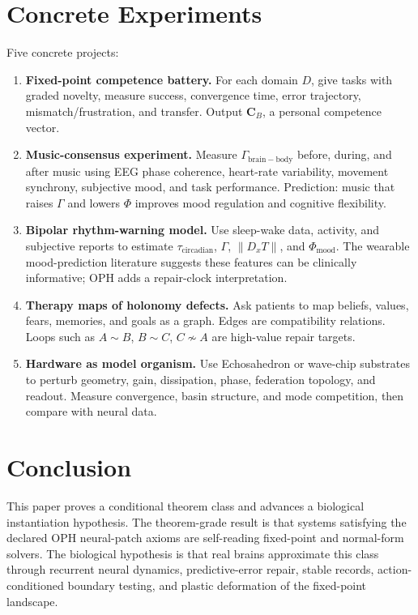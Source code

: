 \documentclass[11pt]{article}
\theoremstyle{remark}
\theoremstyle{plain}
\begin{document}
\section{Concrete Experiments}

Five concrete projects:
\begin{enumerate}
\item \textbf{Fixed-point competence battery.} For each domain \(D\), give tasks with graded novelty, measure success, convergence time, error trajectory, mismatch/frustration, and transfer. Output \(\mathbf C_B\), a personal competence vector.
\item \textbf{Music-consensus experiment.} Measure \(\Gamma_{\mathrm{brain-body}}\) before, during, and after music using EEG phase coherence, heart-rate variability, movement synchrony, subjective mood, and task performance. Prediction: music that raises \(\Gamma\) and lowers \(\Phi\) improves mood regulation and cognitive flexibility.
\item \textbf{Bipolar rhythm-warning model.} Use sleep-wake data, activity, and subjective reports to estimate \(\tau_{\mathrm{circadian}}\), \(\Gamma\), \(\|D_xT\|\), and \(\Phi_{\mathrm{mood}}\). The wearable mood-prediction literature suggests these features can be clinically informative; OPH adds a repair-clock interpretation.
\item \textbf{Therapy maps of holonomy defects.} Ask patients to map beliefs, values, fears, memories, and goals as a graph. Edges are compatibility relations. Loops such as \(A\sim B\), \(B\sim C\), \(C\not\sim A\) are high-value repair targets.
\item \textbf{Hardware as model organism.} Use Echosahedron or wave-chip substrates to perturb geometry, gain, dissipation, phase, federation topology, and readout. Measure convergence, basin structure, and mode competition, then compare with neural data.
\end{enumerate}

\section{Conclusion}

This paper proves a conditional theorem class and advances a biological instantiation hypothesis. The theorem-grade result is that systems satisfying the declared OPH neural-patch axioms are self-reading fixed-point and normal-form solvers. The biological hypothesis is that real brains approximate this class through recurrent neural dynamics, predictive-error repair, stable records, action-conditioned boundary testing, and plastic deformation of the fixed-point landscape.
\end{document}
